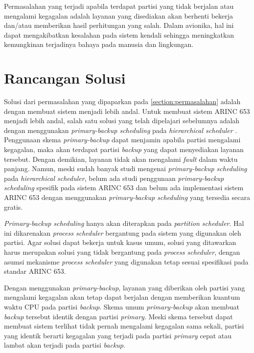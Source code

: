 Permasalahan yang terjadi apabila terdapat partisi yang tidak berjalan atau mengalami kegagalan
adalah layanan yang disediakan akan berhenti bekerja dan/atau memberikan hasil perhitungan yang
salah. Dalam avionika, hal ini dapat mengakibatkan kesalahan pada sistem kendali sehingga
meningkatkan kemungkinan terjadinya bahaya pada manusia dan lingkungan.

\section{Rancangan Solusi}
\label{section:solution}

Solusi dari permasalahan yang dipaparkan pada \autoref{section:permasalahan} adalah dengan
membuat sistem menjadi lebih andal. Untuk membuat sistem ARINC 653 menjadi lebih andal, salah
satu solusi yang telah dipelajari sebelumnya adalah dengan menggunakan \textit{primary-backup
scheduling} pada \textit{hierarchical scheduler} \citep{Campbell1986} \citep{Bertossi2006}.
Penggunaan skema \textit{primary-backup} dapat menjamin apabila partisi mengalami kegagalan,
maka akan terdapat partisi \textit{backup} yang dapat menyediakan layanan tersebut. Dengan
demikian, layanan tidak akan mengalami \textit{fault} dalam waktu panjang.  Namun, meski sudah
banyak studi mengenai \textit{primary-backup scheduling} pada \textit{hierarchical scheduler},
belum ada studi penggunaan \textit{primary-backup scheduling} spesifik pada sistem ARINC 653 dan
belum ada implementasi sistem ARINC 653 dengan menggunakan \textit{primary-backup scheduling}
yang tersedia secara gratis.

\textit{Primary-backup scheduling} hanya akan diterapkan pada \textit{partition scheduler}. Hal
ini dikarenakan \textit{process scheduler} bergantung pada sistem yang digunakan oleh partisi.
Agar solusi dapat bekerja untuk kasus umum, solusi yang ditawarkan harus merupakan solusi yang
tidak bergantung pada \textit{process scheduler}, dengan asumsi mekanisme \textit{process scheduler}
yang digunakan tetap sesuai spesifikasi pada standar ARINC 653.

Dengan menggunakan \textit{primary-backup}, layanan yang diberikan oleh partisi yang mengalami
kegagalan akan tetap dapat berjalan dengan memberikan kuantum waktu CPU pada partisi \textit{backup}.
Skema umum \textit{primary-backup} akan membuat \textit{backup} tersebut identik dengan partisi
\textit{primary}. Meski skema tersebut dapat membuat sistem terlihat tidak pernah mengalami
kegagalan sama sekali, partisi yang identik berarti kegagalan yang terjadi pada partisi
\textit{primary} cepat atau lambat akan terjadi pada partisi \textit{backup}.

